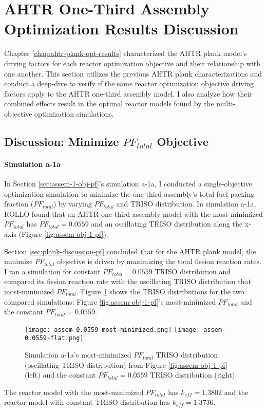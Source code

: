 \section{AHTR One-Third Assembly Optimization Results Discussion}
\label{sec:assem-discussion}
Chapter \ref{chap:ahtr-plank-opt-results} characterized the \gls{AHTR} plank model's 
driving factors for each reactor optimization objective and their relationship with 
one another. 
This section utilizes the previous \gls{AHTR} plank characterizations and conduct 
a deep-dive to verify if the same reactor optimization objective driving factors apply 
to the \gls{AHTR} one-third assembly model. 
I also analyze how their combined effects result in the optimal reactor models found by 
the multi-objective optimization simulations. 

\subsection{Discussion: Minimize $PF_{total}$ Objective}
\label{sec:assem-discussion-pf}
\paragraph{Simulation a-1a}
In Section \ref{sec:assem-1-obj-pf}'s simulation a-1a, I conducted a single-objective 
optimization simulation to minimize the one-third assembly's total fuel packing fraction 
($PF_{total}$) by varying $PF_{total}$ and TRISO distribution. 
In simulation a-1a, \gls{ROLLO} found that an \gls{AHTR} one-third assembly model with 
the most-minimized $PF_{total}$ has $PF_{total}= 0.0559$ and an oscillating TRISO distribution 
along the x-axis (Figure \ref{fig:assem-obj-1-pf}).

Section \ref{sec:plank-discussion-pf} concluded that for the \gls{AHTR} plank model, 
the minimize $PF_{total}$ objective is driven by maximizing the total fission reaction 
rates. 
I ran a simulation for constant $PF_{total} = 0.0559$ TRISO distribution and compared its 
fission reaction rate with the oscillating TRISO distribution that most-minimized $PF_{total}$. 
Figure \ref{fig:assem-0.0559-comparison} shows the TRISO distributions for the two compared 
simulations: Figure \ref{fig:assem-obj-1-pf}'s most-minimized $PF_{total}$ 
and the constant $PF_{total} = 0.0559$. 
\begin{figure}[htbp!]
    \centering
    \texttt{[image: assem-0.0559-most-minimized.png]} 
    \texttt{[image: assem-0.0559-flat.png]} 
    \caption{Simulation a-1a's most-minimized $PF_{total}$ TRISO distribution 
    (oscillating TRISO distribution) from Figure \ref{fig:assem-obj-1-pf} (left) and the 
    constant $PF_{total} = 0.0559$ TRISO distribution (right).}
    \label{fig:assem-0.0559-comparison}
\end{figure}
The reactor model with the most-minimized $PF_{total}$ has $k_{eff}=1.3802$ and 
the reactor model with constant TRISO distribution has $k_{eff}=1.3736$.

